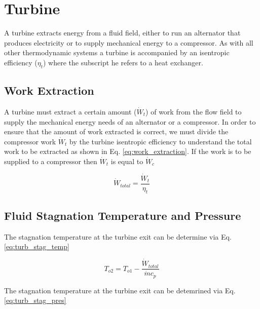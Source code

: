 \section{Turbine}
A turbine extracts energy from a fluid field, either to run an alternator that produces electricity or to supply mechanical energy to
a compressor.  As with all other thermodynamic systems a turbine is accompanied by an isentropic efficiency ($\eta_{t}$) 
where the subscript he refers to a heat exchanger.

\subsection{Work Extraction}
A turbine must extract a certain amount ($\dot{W}_t$) of work from the flow field to supply the mechanical energy needs of an alternator
or a compressor.  In order to ensure that the amount of work extracted is correct, we must divide the compressor work $\dot{W}_t$ by 
the turbine isentropic efficiency to understand the total work to be extracted as shown in Eq. \ref{eq:work_extraction}.  If the work 
is to be supplied to a compressor then $\dot{W}_t$ is equal to $\dot{W}_c$

\begin{equation}
\label{eq:work_extraction}
\dot{W}_{total} = \frac{\dot{W}_t}{\eta_t}
\end{equation}


\subsection{Fluid Stagnation Temperature and Pressure}
The stagnation temperature at the turbine exit can be determine via Eq. \ref{eq:turb_stag_temp}

\begin{equation}
\label{eq:turb_stag_temp}
T_{o2} = T_{o1} - \frac{\dot{W}_{total}}{\dot{m}c_p}
\end{equation}

The stagnation temperature at the turbine exit can be detemrined via Eq. \ref{eq:turb_stag_pres}

